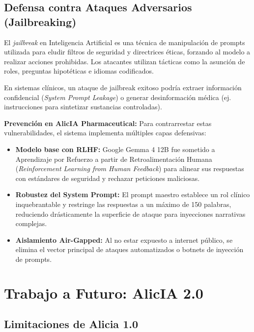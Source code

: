 \documentclass[12pt,a4paper]{article}
\begin{document}
\subsection{Defensa contra Ataques Adversarios (Jailbreaking)}

El \textit{jailbreak} en Inteligencia Artificial es una técnica de manipulación de prompts utilizada para eludir filtros de seguridad y directrices éticas, forzando al modelo a realizar acciones prohibidas. Los atacantes utilizan tácticas como la asunción de roles, preguntas hipotéticas e idiomas codificados.

En sistemas clínicos, un ataque de jailbreak exitoso podría extraer información confidencial (\textit{System Prompt Leakage}) o generar desinformación médica (ej. instrucciones para sintetizar sustancias controladas). 

\textbf{Prevención en AlicIA Pharmaceutical:}
Para contrarrestar estas vulnerabilidades, el sistema implementa múltiples capas defensivas:
\begin{itemize}
  \item \textbf{Modelo base con RLHF:} Google Gemma 4 12B fue sometido a Aprendizaje por Refuerzo a partir de Retroalimentación Humana (\textit{Reinforcement Learning from Human Feedback}) para alinear sus respuestas con estándares de seguridad y rechazar peticiones maliciosas.
  \item \textbf{Robustez del System Prompt:} El prompt maestro establece un rol clínico inquebrantable y restringe las respuestas a un máximo de 150 palabras, reduciendo drásticamente la superficie de ataque para inyecciones narrativas complejas.
  \item \textbf{Aislamiento Air-Gapped:} Al no estar expuesto a internet público, se elimina el vector principal de ataques automatizados o botnets de inyección de prompts.
\end{itemize}

\newpage

\section{Trabajo a Futuro: AlicIA 2.0}

\subsection{Limitaciones de Alicia 1.0}
\end{document}
